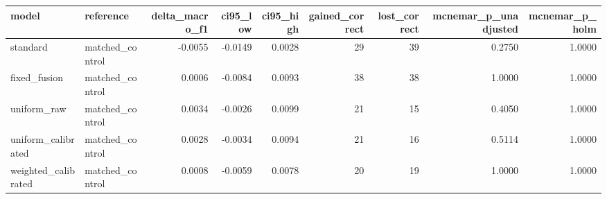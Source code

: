 \begin{tabular}{llrrrrrrr}
\toprule
model & reference & delta\_macro\_f1 & ci95\_low & ci95\_high & gained\_correct & lost\_correct & mcnemar\_p\_unadjusted & mcnemar\_p\_holm \\
\midrule
standard & matched\_control & -0.0055 & -0.0149 & 0.0028 & 29 & 39 & 0.2750 & 1.0000 \\
fixed\_fusion & matched\_control & 0.0006 & -0.0084 & 0.0093 & 38 & 38 & 1.0000 & 1.0000 \\
uniform\_raw & matched\_control & 0.0034 & -0.0026 & 0.0099 & 21 & 15 & 0.4050 & 1.0000 \\
uniform\_calibrated & matched\_control & 0.0028 & -0.0034 & 0.0094 & 21 & 16 & 0.5114 & 1.0000 \\
weighted\_calibrated & matched\_control & 0.0008 & -0.0059 & 0.0078 & 20 & 19 & 1.0000 & 1.0000 \\
\bottomrule
\end{tabular}
